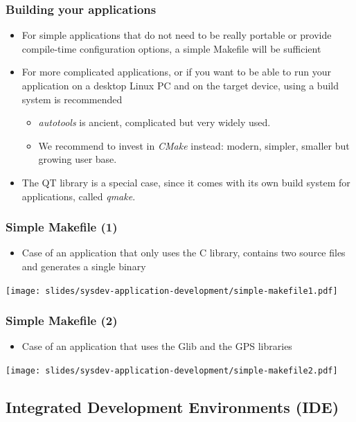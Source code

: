 \begin{frame}
  \frametitle{Building your applications}
  \begin{itemize}
  \item For simple applications that do not need to be really portable
    or provide compile-time configuration options, a simple Makefile
    will be sufficient
  \item For more complicated applications, or if you want to be able
    to run your application on a desktop Linux PC and on the target
    device, using a build system is recommended
    \begin{itemize}
    \item {\em autotools} is ancient, complicated but very
      widely used.
    \item We recommend to invest in {\em CMake} instead: modern, simpler, smaller but
      growing user base.
    \end{itemize}
  \item The QT library is a special case, since it comes with its own
    build system for applications, called {\em qmake}.
  \end{itemize}
\end{frame}

\begin{frame}[fragile]
  \frametitle{Simple Makefile (1)}
  \begin{itemize}
  \item Case of an application that only uses the C library, contains two source
    files and generates a single binary
  \end{itemize}
  \vfill
  \texttt{[image: slides/sysdev-application-development/simple-makefile1.pdf]}\\
\end{frame}

\begin{frame}[fragile]
  \frametitle{Simple Makefile (2)}
\begin{itemize}
\item Case of an application that uses the Glib and the GPS libraries
\end{itemize}
  \vfill
  \texttt{[image: slides/sysdev-application-development/simple-makefile2.pdf]}\\
\end{frame}

\subsection[Source management \& IDEs]{Integrated
  Development Environments (IDE)}

